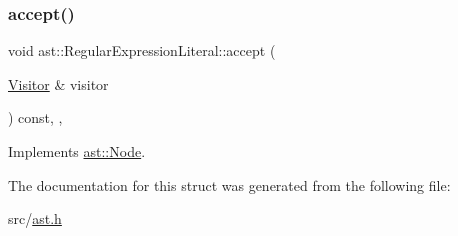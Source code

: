 \subsubsection{\texorpdfstring{accept()}{accept()}}
{\footnotesize\ttfamily void ast\+::\+Regular\+Expression\+Literal\+::accept (\begin{DoxyParamCaption}\item[{\hyperlink{structast_1_1_visitor}{Visitor} \&}]{visitor }\end{DoxyParamCaption}) const\hspace{0.3cm}{\ttfamily [inline]}, {\ttfamily [override]}, {\ttfamily [virtual]}}



Implements \hyperlink{structast_1_1_node_abc089ee6caaf06a4445ebdd8391fdebc}{ast\+::\+Node}.



The documentation for this struct was generated from the following file\+:\begin{DoxyCompactItemize}
\item 
src/\hyperlink{ast_8h}{ast.\+h}\end{DoxyCompactItemize}
